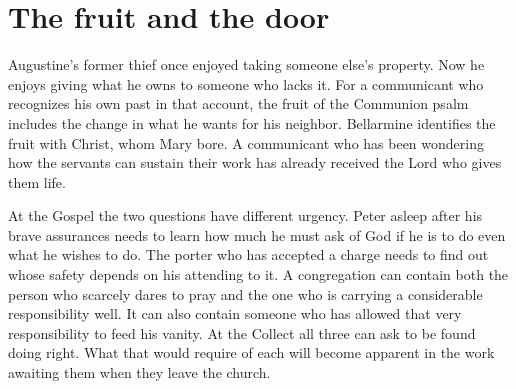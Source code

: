 \section{The fruit and the door}

Augustine's former thief once enjoyed taking someone else's property. Now he enjoys giving what he owns to someone who lacks it. For a communicant who recognizes his own past in that account, the fruit of the Communion psalm includes the change in what he wants for his neighbor. Bellarmine identifies the fruit with Christ, whom Mary bore. A communicant who has been wondering how the servants can sustain their work has already received the Lord who gives them life.

At the Gospel the two questions have different urgency. Peter asleep after his brave assurances needs to learn how much he must ask of God if he is to do even what he wishes to do. The porter who has accepted a charge needs to find out whose safety depends on his attending to it. A congregation can contain both the person who scarcely dares to pray and the one who is carrying a considerable responsibility well. It can also contain someone who has allowed that very responsibility to feed his vanity. At the Collect all three can ask to be found doing right. What that would require of each will become apparent in the work awaiting them when they leave the church.
